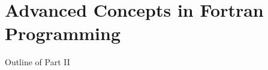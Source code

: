 \documentclass[c,mathserif,compress,xcolor=svgnames]{beamer}
\begin{document}

\part{Advanced Concepts in Fortran Programming}
\frame[label=day2]{\partpage}
\begin{frame}{Outline of Part II}
  \tableofcontents[part=2,hideallsubsections]
\end{frame}
\end{document}
